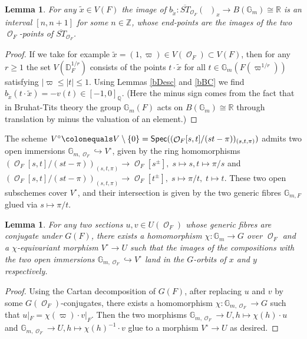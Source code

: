 \documentclass{article}
\DeclareMathOperator{\CO}{\mathcal{O}}
\DeclareMathOperator{\Spec}{\mathsf{Spec}}
\newcommand{\BG}{{\mathbb{G}}}
\newcommand{\BQ}{{\mathbb{Q}}}
\newcommand{\BR}{{\mathbb{R}}}
\newcommand{\BZ}{{\mathbb{Z}}}
\newcommand{\Dr}[1][r]{\mathbb{D}_F^{1/#1}}
\DeclareMathOperator{\Dinfty}{\mathbb{D}_F^{1/\infty}}
\newcommand{\defeq}{\colonequals}
\let\into\hookrightarrow
\theoremstyle{definition}
\theoremstyle{plain}
\newtheorem{lemma}[definition]{Lemma}
\begin{document}
\begin{lemma}
    For any $\tilde x \in V(F)$ the image of $b_{\tilde x} \colon \overline{ST}_{\CO_F}(\Dinfty)_x \to B(\BG_m) \cong \BR$ is an interval $[n, n+1]$ for some $n \in \BZ$, whose end-points are the images of the two $\CO_F$-points of $\overline{ST}_{\CO_F}$.
\end{lemma}
\begin{proof}
    If we take for example $\tilde x =(1,\varpi) \in V(\CO_F) \subset V(F)$, then for any $r\geq 1$ the set $V(\Dr)$ consists of the points $t \cdot \tilde x$ for all $t \in \BG_m(F(\varpi^{1/r}))$ satisfying $|\varpi \leq |t| \leq 1$. Using Lemmas \ref{bDesc} and \ref{bBC} we find $b_{\tilde x}(t\cdot \tilde x)=-v(t) \in [-1,0]_{\BQ}$. (Here the minus sign comes from the fact that in Bruhat-Tits theory the group $\BG_m(F)$ acts on $B(\BG_m) \cong \mathbb{R}$ through translation by minus the valuation of an element.)
\end{proof}


    The scheme $V^\circ\defeq V \setminus \{0\}=\Spec((\CO_F[s,t]/(st-\pi))_{(s,t,\pi)})$ admits two open immersions $\BG_{m,\CO_F} \into V^\circ$, given by the ring homomorphisms $(\CO_F[s,t]/(st-\pi))_{(s,t,\pi)} \to \CO_F[s^\pm],\; s\mapsto s, t\mapsto \pi/s$ and $(\CO_F[s,t]/(st-\pi))_{(s,t,\pi)} \to \CO_F[t^\pm],\; s \mapsto \pi/t,\; t \mapsto t$. These two open subschemes cover $V^\circ$, and their intersection is given by the two generic fibres $\BG_{m,F}$ glued via $s \mapsto \pi/t$.

\begin{lemma}\label{SomeHomCons}
    For any two sections $u, v \in U(\CO_F)$ whose generic fibres are conjugate under $G(F)$, there exists a homomorphism $\chi\colon \BG_{m} \to G$ over $\CO_F$ and a $\chi$-equivariant morphism $V^\circ \to U$ such that the images of the compositions with the two open immersions $\BG_{m,\CO_F} \into V^\circ$ land in the $G$-orbits of $x$ and $y$ respectively.
\end{lemma}
\begin{proof}
    Using the Cartan decomposition of $G(F)$, after replacing $u$ and $v$ by some $G(\CO_F)$-conjugates, there exists a homomorphism $\chi\colon \BG_{m,\CO_F} \to G$ such that $u|_F=\chi(\varpi)\cdot v|_F$. Then the two morphisms $\BG_{m,\CO_F} \to U, h \mapsto \chi(h)\cdot u$ and $\BG_{m,\CO_F} \to U, h \mapsto \chi(h)^{-1}\cdot v$ glue to a morphism $V^\circ \to U$ as desired.
\end{proof}
\end{document}
